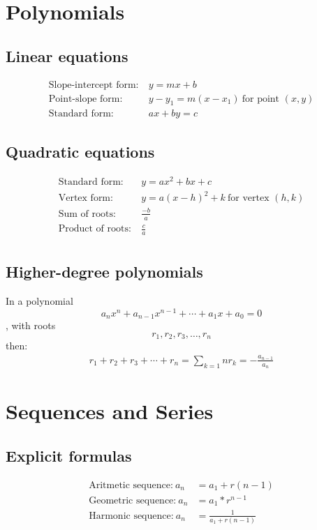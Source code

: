 \section{Polynomials}

\subsection{Linear equations}

\[\begin{aligned}
	\text{Slope-intercept form:}&~y = mx + b \\
	\text{Point-slope form:}&~y - y_1 = m(x - x_1)~\text{for point $(x, y)$} \\
	\text{Standard form:}&~ax + by = c
\end{aligned}\]


\subsection{Quadratic equations}

\[\begin{aligned}
	\text{Standard form:}&~y = ax^2 + bx + c \\
	\text{Vertex form:}&~y = a(x-h)^2 + k~\text{for vertex $(h, k)$} \\
	\text{Sum of roots:}&~\frac{-b}{a} \\
	\text{Product of roots:}&~\frac{c}{a} \\
\end{aligned}\]

\subsection{Higher-degree polynomials}
In a polynomial
\[
	a_n x^n + a_{n-1} x^{n-1} + \dotsb + a_1 x + a_0 = 0
\]
, with roots
\[
	r_1, r_2, r_3, \dotsc , r_n
\]
then:
\[\begin{aligned}
	r_1 + r_2 + r_3 + \dotsb + r_n = \sum_{k=1}{n} r_k = -\frac{a_{n-1}}{a_n}
\end{aligned}\]

\columnbreak


\section{Sequences and Series}

\subsection{Explicit formulas}
\[\begin{aligned}
	\text{Aritmetic sequence:}~a_n &= a_1 + r(n - 1) \\
	\text{Geometric sequence:}~a_n &= a_1 * r^{n - 1} \\
	\text{Harmonic sequence:}~a_n &= \frac{1}{a_1 + r(n - 1)}
\end{aligned}\]


